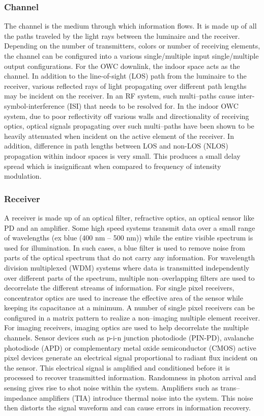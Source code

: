 \subsubsection{Channel}
\label{subsubsec:outlineChannel}
The channel is the medium through which information flows. It is made up of all the paths traveled by the light rays between the luminaire and the receiver. Depending on the number of transmitters, colors or number of receiving elements, the channel can be configured into a various single/multiple input single/multiple output configurations. For the OWC downlink, the indoor space acts as the channel. In addition to the line-of-sight (LOS) path from the luminaire to the receiver, various reflected rays of light propagating over different path lengths may be incident on the receiver. In an RF system, such multi--paths cause inter-symbol-interference (ISI) that needs to be resolved for. In the indoor OWC system, due to poor reflectivity off various walls and directionality of receiving optics, optical signals propagating over such multi--paths have been shown to be heavily attenuated when incident on the active element of the receiver. In addition, difference in path lengths between LOS and non-LOS (NLOS) propagation within indoor spaces is very small. This produces a small delay spread which is insignificant when compared to frequency of intensity modulation.

\subsubsection{Receiver}
\label{subsubsec:outlineReceiver}
A receiver is made up of an optical filter, refractive optics, an optical sensor like PD and an amplifier. Some high speed systems transmit data over a small range of wavelengths (ex blue (400 nm -- 500 nm)) while the entire visible spectrum is used for illumination. In such cases, a blue filter is used to remove noise from parts of the optical spectrum that do not carry any information. For wavelength division multiplexed (WDM) systems where data is transmitted independently over different parts of the spectrum, multiple non--overlapping filters are used to decorrelate the different streams of information. For single pixel receivers, concentrator optics are used to increase the effective area of the sensor while keeping its capacitance at a minimum. A number of single pixel receivers can be configured in a matrix pattern to realize a non--imaging multiple element receiver. For imaging receivers, imaging optics are used to help decorrelate the multiple channels. Sensor devices such as p-i-n junction photodiode (PIN-PD), avalanche photodiode (APD) or complementary metal oxide semiconductor (CMOS) active pixel devices generate an electrical signal proportional to radiant flux incident on the sensor. This electrical signal is amplified and conditioned before it is processed to recover transmitted information. Randomness in photon arrival and sensing gives rise to shot noise within the system. Amplifiers such as trans--impedance amplifiers (TIA) introduce thermal noise into the system. This noise then distorts the signal waveform and can cause errors in information recovery.


